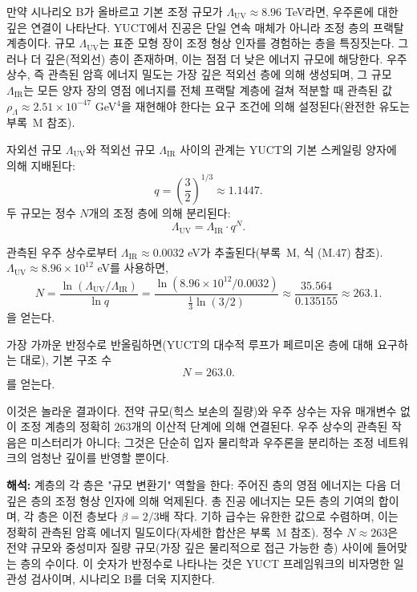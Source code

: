 \documentclass[11pt,a4paper]{article}
\newcommand{\LUV}{\Lambda_{\mathrm{UV}}}
\theoremstyle{remark}
\begin{document}
	만약 시나리오 B가 올바르고 기본 조정 규모가 \(\LUV \approx 8.96\) TeV라면, 우주론에 대한 깊은 연결이 나타난다. YUCT에서 진공은 단일 연속 매체가 아니라 조정 층의 프랙탈 계층이다. 규모 \(\LUV\)는 표준 모형 장이 조정 형상 인자를 경험하는 층을 특징짓는다. 그러나 더 깊은(적외선) 층이 존재하며, 이는 점점 더 낮은 에너지 규모에 해당한다. 우주 상수, 즉 관측된 암흑 에너지 밀도는 가장 깊은 적외선 층에 의해 생성되며, 그 규모 \(\Lambda_{\mathrm{IR}}\)는 모든 양자 장의 영점 에너지를 전체 프랙탈 계층에 걸쳐 적분할 때 관측된 값 \(\rho_{\Lambda} \approx 2.51 \times 10^{-47}\) GeV\(^4\)을 재현해야 한다는 요구 조건에 의해 설정된다(완전한 유도는 부록~M 참조).
	
	자외선 규모 \(\LUV\)와 적외선 규모 \(\Lambda_{\mathrm{IR}}\) 사이의 관계는 YUCT의 기본 스케일링 양자에 의해 지배된다:
	\begin{equation}
		q = \left(\frac{3}{2}\right)^{1/3} \approx 1.1447.
	\end{equation}
	두 규모는 정수 \(N\)개의 조정 층에 의해 분리된다:
	\begin{equation}
		\LUV = \Lambda_{\mathrm{IR}} \cdot q^{N}.
		\label{eq:bridge}
	\end{equation}
	
	관측된 우주 상수로부터 \(\Lambda_{\mathrm{IR}} \approx 0.0032\) eV가 추출된다(부록~M, 식 (M.47) 참조). \(\LUV \approx 8.96 \times 10^{12}\) eV를 사용하면,
	\begin{equation}
		N = \frac{\ln(\LUV / \Lambda_{\mathrm{IR}})}{\ln q}
		= \frac{\ln(8.96 \times 10^{12} / 0.0032)}{\frac{1}{3}\ln(3/2)}
		\approx \frac{35.564}{0.135155} \approx 263.1.
		\label{eq:N_layers}
	\end{equation}
	을 얻는다.
	
	가장 가까운 반정수로 반올림하면(YUCT의 대수적 루프가 페르미온 층에 대해 요구하는 대로), 기본 구조 수
	\begin{equation}
		\boxed{N = 263.0}.
	\end{equation}
	를 얻는다.
	
	이것은 놀라운 결과이다. 전약 규모(힉스 보손의 질량)와 우주 상수는 자유 매개변수 없이 조정 계층의 정확히 \(263\)개의 이산적 단계에 의해 연결된다. 우주 상수의 관측된 작음은 미스터리가 아니다; 그것은 단순히 입자 물리학과 우주론을 분리하는 조정 네트워크의 엄청난 깊이를 반영할 뿐이다.
	
	\textbf{해석:} 계층의 각 층은 "규모 변환기" 역할을 한다: 주어진 층의 영점 에너지는 다음 더 깊은 층의 조정 형상 인자에 의해 억제된다. 총 진공 에너지는 모든 층의 기여의 합이며, 각 층은 이전 층보다 \(\beta = 2/3\)배 작다. 기하 급수는 유한한 값으로 수렴하며, 이는 정확히 관측된 암흑 에너지 밀도이다(자세한 합산은 부록~M 참조). 정수 \(N \approx 263\)은 전약 규모와 중성미자 질량 규모(가장 깊은 물리적으로 접근 가능한 층) 사이에 들어맞는 층의 수이다. 이 숫자가 반정수로 나타나는 것은 YUCT 프레임워크의 비자명한 일관성 검사이며, 시나리오 B를 더욱 지지한다.
	
\end{document}
